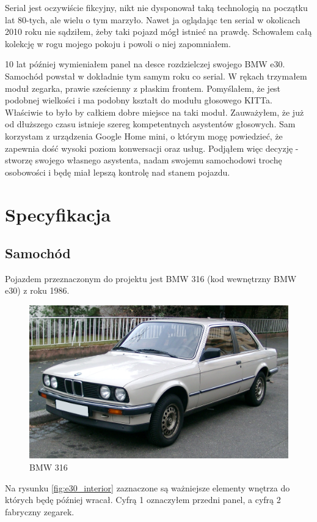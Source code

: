 \documentclass[declaration,shortabstract, inz]{iithesis}
\begin{document}
Serial jest oczywiście fikcyjny, nikt nie dysponował taką technologią na początku lat 80-tych, ale wielu o tym marzyło. Nawet ja oglądając ten serial w okolicach 2010 roku nie sądziłem, żeby taki pojazd mógł istnieć na prawdę. Schowałem całą kolekcję w rogu mojego pokoju i powoli o niej zapomniałem.

10 lat później wymieniałem panel na desce rozdzielczej swojego BMW e30. Samochód powstał w dokładnie tym samym roku co serial. W rękach trzymałem moduł zegarka, prawie sześcienny z płaskim frontem. Pomyślałem, że jest podobnej wielkości i ma podobny kształt do modułu głosowego KITTa. Właściwie to było by całkiem dobre miejsce na taki moduł. Zauważyłem, że już od dłuższego czasu istnieje szereg kompetentnych asystentów głosowych. Sam korzystam z urządzenia Google Home mini, o którym mogę powiedzieć, że zapewnia dość wysoki poziom konwersacji oraz usług. Podjąłem więc decyzję - stworzę swojego własnego asystenta, nadam swojemu samochodowi trochę osobowości i będę miał lepszą kontrolę nad stanem pojazdu.

\chapter{Specyfikacja}
\section{Samochód}
Pojazdem przeznaczonym do projektu jest BMW 316 (kod wewnętrzny BMW e30) z roku 1986.

\begin{figure}[htp]
    \centering
    \includegraphics[width=12cm]{images/bmw_e30_front.jpg}
    \caption{BMW 316}
    \label{fig:e30_front}
\end{figure}

Na rysunku \ref{fig:e30_interior} zaznaczone są ważniejsze elementy wnętrza do których będę później wracał. Cyfrą 1 oznaczyłem przedni panel, a cyfrą 2 fabryczny zegarek.
\end{document}
